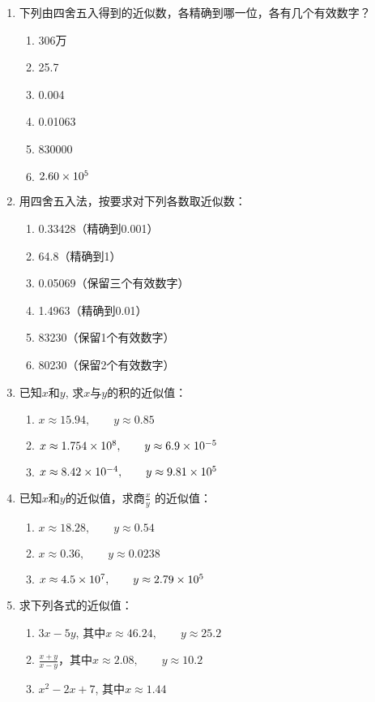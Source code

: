 \begin{ex}
\begin{enumerate}
    \item 下列由四舍五入得到的近似数，各精确到哪一位，各有几个有效数字？
\begin{multicols}{3}
\begin{enumerate}
    \item 306万
    \item 25.7
    \item 0.004
    \item 0.01063
    \item 830000
    \item $2.60\times10^5$
\end{enumerate}
\end{multicols}

    \item 
    用四舍五入法，按要求对下列各数取近似数：
\begin{enumerate}
    \item 0.33428（精确到0.001）
    \item 64.8（精确到1）
    \item 0.05069（保留三个有效数字）
    \item 1.4963（精确到0.01）
    \item 83230（保留1个有效数字）
    \item 80230（保留2个有效数字）
\end{enumerate}

    \item 已知$x$和$y$, 求$x$与$y$的积的近似值：
        \begin{enumerate}
\item $x\approx 15.94,\qquad y\approx  0.85$
\item $x\approx 1.754\times10^8,\qquad y\approx 6.9\times10^{-5}$
\item $x\approx  8.42\times10^{-4},\qquad y\approx 9.81\times10^5$
        \end{enumerate}

    \item 
    已知$x$和$y$的近似值，求商$\frac{x}{y}$
    的近似值：
\begin{enumerate}
    \item $x\approx 18.28,\qquad y\approx 0.54$
    \item $x\approx 0.36,\qquad y\approx 0.0238$
    \item $x\approx 4.5\times10^7,\qquad y\approx 2.79\times10^5$
\end{enumerate}

    \item 求下列各式的近似值：
\begin{enumerate}
    \item $3x-5y$, 其中$x\approx 46.24,\qquad y\approx 25.2$
    \item $\frac{x+y}{x-y}$，其中$x\approx 2.08,\qquad y\approx 10.2$
    \item $x^2-2x+7$, 其中$x\approx 1.44$
\end{enumerate}
\end{enumerate}
\end{ex}

